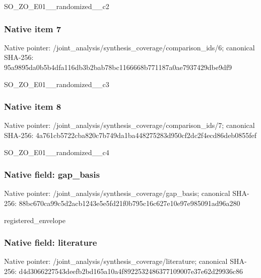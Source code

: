 \documentclass[10pt,a4paper]{article}
\begin{document}
\begingroup\raggedright\sloppy SO\_\allowbreak{}ZO\_\allowbreak{}E01\_\allowbreak{}\_\allowbreak{}randomized\_\allowbreak{}\_\allowbreak{}c2\par\endgroup

\subsubsection{Native item 7}
Native pointer: /joint\_\allowbreak{}analysis/synthesis\_\allowbreak{}coverage/comparison\_\allowbreak{}ids/6; canonical SHA-256: 95a9895da0b5b4dfa116db3b2bab78bc1166668b771187a0ae7937429dbe9df9

\begingroup\raggedright\sloppy SO\_\allowbreak{}ZO\_\allowbreak{}E01\_\allowbreak{}\_\allowbreak{}randomized\_\allowbreak{}\_\allowbreak{}c3\par\endgroup

\subsubsection{Native item 8}
Native pointer: /joint\_\allowbreak{}analysis/synthesis\_\allowbreak{}coverage/comparison\_\allowbreak{}ids/7; canonical SHA-256: 4a761cb5722cba820c7b749da1ba448275283d950cf2dc2f4ecd86deb0855fef

\begingroup\raggedright\sloppy SO\_\allowbreak{}ZO\_\allowbreak{}E01\_\allowbreak{}\_\allowbreak{}randomized\_\allowbreak{}\_\allowbreak{}c4\par\endgroup

\subsubsection{Native field: gap\_\allowbreak{}basis}
Native pointer: /joint\_\allowbreak{}analysis/synthesis\_\allowbreak{}coverage/gap\_\allowbreak{}basis; canonical SHA-256: 88bc670ca99c5d2acb1243e5e5fd21f0b795c16c627e10e97e985091ad96a280

\begingroup\raggedright\sloppy registered\_\allowbreak{}envelope\par\endgroup

\subsubsection{Native field: literature}
Native pointer: /joint\_\allowbreak{}analysis/synthesis\_\allowbreak{}coverage/literature; canonical SHA-256: d4d3066227543deefb2bd165a10a4f8922532486377109007e37e62d29936c86
\end{document}
